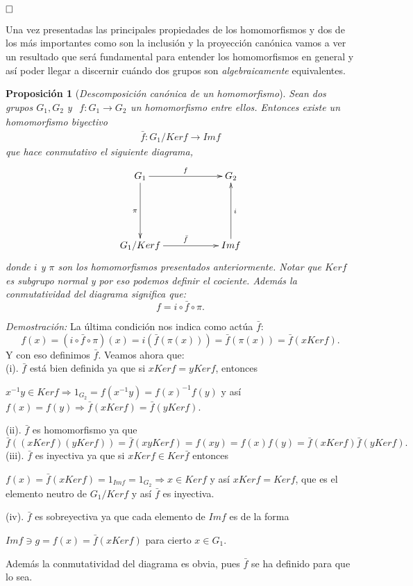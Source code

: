 \documentclass[12pt]{article}
\newtheorem{proposition}[theorem]{Proposición}
\begin{document}
$\hfill \square$

Una vez presentadas las principales propiedades de los homomorfismos y dos de los más importantes como son la inclusión y la proyección canónica vamos a ver un resultado que será fundamental para entender los homomorfismos en general y así poder llegar a discernir cuándo dos grupos son \textit{algebraicamente} equivalentes.

\begin{proposition}[\textit{Descomposición canónica de un homomorfismo}]
Sean dos grupos $G_{1}, G_{2}$ y 
$\begin{array}{rccl}
f\colon G_{1} \longrightarrow  G_{2}
\end{array}
$un homomorfismo entre ellos. Entonces existe un homomorfismo biyectivo $$
\begin{array}{rccl}
\bar{f}\colon G_{1}/Ker f \longrightarrow  Im f
\end{array}
$$ que hace conmutativo el siguiente diagrama, $$\xymatrix @=2cm {G_{1}\ar[r]^{f} \ar[d]_\pi & G_{2}  \\ G_{1}/Ker f \ar[r]^{\bar{f}} & Im f \ar[u]_{i}  }$$
donde $i$ y $\pi$ son los homomorfismos presentados anteriormente. Notar que $Ker f$ es subgrupo normal y por eso podemos definir el cociente. Además la conmutatividad del diagrama significa que: $$f = i \circ \bar{f} \circ \pi.$$
\end{proposition}
\emph{Demostración: } La última condición nos indica como actúa $\bar{f}$:
$$f(x) = (i \circ \bar{f} \circ \pi) (x) = i(\bar{f}(\pi(x))) = \bar{f}(\pi(x)) = \bar{f}(x Ker f).$$ Y con eso definimos $\bar{f}$. Veamos ahora que: \vspace{0.2cm}\\
(i). $\bar{f}$ está bien definida ya que si $xKer f = yKer f$, entonces 
\begin{center}
$x^{-1}y \in Ker f \Longrightarrow 1_{G_{2}} = f(x^{-1}y) = f(x)^{-1}f(y)$ y así $f(x) = f(y) \Longrightarrow \bar{f}(xKer f) = \bar{f}(yKer f)$.
\end{center}
(ii). $\bar{f}$ es homomorfismo ya que $$\bar{f}((xKerf)(yKerf)) = \bar{f}(xyKerf) = f(xy) = f(x)f(y) = \bar{f}(xKerf)\bar{f}(yKerf).$$
(iii). $\bar{f}$ es inyectiva ya que si $xKerf \in Ker\bar{f}$ entonces 

$f(x) = \bar{f}(xKerf) = 1_{Im f} = 1_{G_{2}} \Longrightarrow x \in Kerf$ y así $xKerf = Kerf$, que es el elemento neutro de $G_{1}/Ker f$ y así $\bar{f}$ es inyectiva.

(iv). $\bar{f}$ es sobreyectiva ya que cada elemento de $Im f$ es de la forma
\begin{center}
$Im f\ni g = f(x) = \bar{f}(xKerf)$ para cierto $x \in G_{1}.$
\end{center}
Además la conmutatividad del diagrama es obvia, pues $\bar{f}$ se ha definido para que lo sea.
\end{document}
